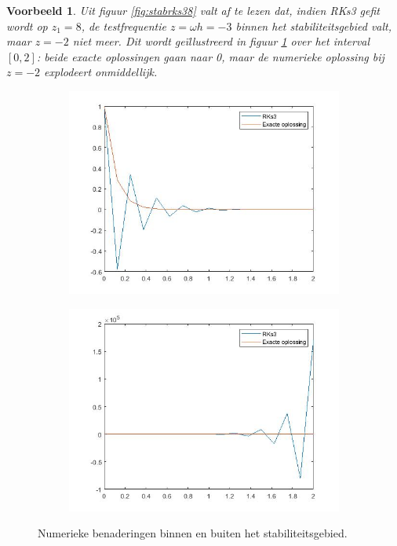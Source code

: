 \documentclass[12pt]{article}
\newtheorem{vbn}[defn]{Voorbeeld}
\begin{document}
\begin{vbn}
    Uit figuur \ref{fig:stabrks38} valt af te lezen dat, indien RKs3 gefit wordt op \(z_1=8\), de testfrequentie \(z=\omega h=-3\) binnen het stabiliteitsgebied valt, maar \(z=-2\) niet meer. Dit wordt geïllustreerd in figuur \ref{fig:stabrks3ex} over het interval \([0,2]\): beide exacte oplossingen gaan naar 0, maar de numerieke oplossing bij \(z=-2\) explodeert onmiddellijk.
\end{vbn}
\begin{figure}[H]
    \begin{subfigure}{0.49\textwidth}
    \includegraphics[width=0.9\linewidth]{stable_rks3.jpg}
    \end{subfigure}
    \begin{subfigure}{0.49\textwidth}
    \includegraphics[width=0.9\linewidth]{unstable_RKs3.jpg}
    \end{subfigure}
    \caption{Numerieke benaderingen binnen en buiten het stabiliteitsgebied.}
    \label{fig:stabrks3ex}
\end{figure}
\end{document}
